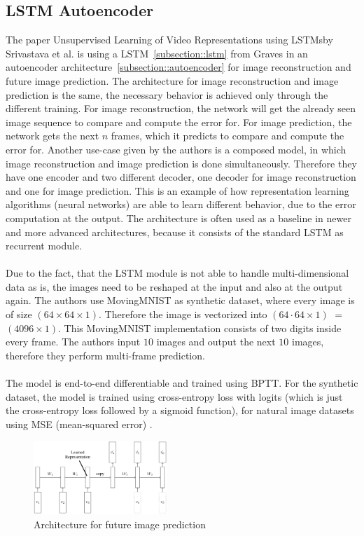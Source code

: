  \subsection{LSTM Autoencoder} \label{subsection::lstm_autoencoder}
  The paper \glqq Unsupervised Learning of Video Representations using LSTMs\grqq by Srivastava et al. \cite{Srivastava2015} is using a LSTM~\ref{subsection::lstm} from Graves 
  \cite{Graves2013} in an autoencoder architecture~\ref{subsection::autoencoder} for image reconstruction and future image prediction.
  The architecture for image reconstruction and image prediction is the same, the necessary behavior is achieved only through the different training.
  For image reconstruction, the network will get the already seen image sequence to compare and compute the error for. For image prediction, the network gets
  the next $n$ frames, which it predicts to compare and compute the error for.
  Another use-case given by the authors is a composed model, in which image reconstruction and image prediction is done simultaneously. Therefore they have
  one encoder and two different decoder, one decoder for image reconstruction and one for image prediction.
  This is an example of how representation learning algorithms (neural networks) are able to learn different behavior, due to the error computation at the output.
  The architecture is often used as a baseline in newer and more advanced architectures, because it consists of the standard LSTM as recurrent module.
  \\\\
  Due to the fact, that the LSTM module is not able to handle multi-dimensional data as is, the images need to be reshaped at the input and also at the output again. The authors use
  MovingMNIST \cite{LeCun1998} as synthetic dataset, where every image is of size $(64 \times 64 \times 1)$. Therefore the image is vectorized into $(64 \cdot 64 \times 1)$ $=$ $(4096 \times 1)$.
  This MovingMNIST implementation consists of two digits inside every frame. The authors input $10$ images and output the next $10$ images, therefore they perform 
  multi-frame prediction.
  \\\\
  The model is end-to-end differentiable and trained using BPTT.
  For the synthetic dataset, the model is trained using cross-entropy loss with logits (which is just the cross-entropy loss followed by a sigmoid function), for 
  natural image datasets using MSE (mean-squared error) \cite{Zhao2017}.
  \begin{figure}[H]
   \includegraphics[width=0.45\textwidth]{../Images/srivastava.png}
   \centering
   \caption{Architecture for future image prediction \cite{Srivastava2015}}
   \label{fig:lstm_architecture}
  \end{figure}
